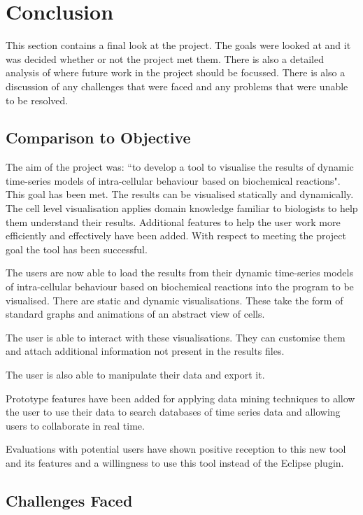 \chapter{Conclusion}

This section contains a final look at the project.  The goals were looked at and it was decided whether or not the project met them.  There is also a detailed analysis of where future work in the project should be focussed.  There is also a discussion of any challenges that were faced and any problems that were unable to be resolved.

\section{Comparison to Objective}
\label{sec:met_goal}

The aim of the project was: ``to develop a tool to visualise the results of dynamic time-series models of intra-cellular behaviour based on biochemical reactions".  This goal has been met.  The results can be visualised statically and dynamically.  The cell level visualisation applies domain knowledge familiar to biologists to help them understand their results.  Additional features to help the user work more efficiently and effectively have been added.  With respect to meeting the project goal the tool has been successful.

The users are now able to load the results from their dynamic time-series models of intra-cellular behaviour based on biochemical reactions into the program to be visualised.  There are static and dynamic visualisations.  These take the form of standard graphs and animations of an abstract view of cells.

The user is able to interact with these visualisations.  They can customise them and attach additional information not present in the results files.

The user is also able to manipulate their data and export it.

Prototype features have been added for applying data mining techniques to allow the user to use their data to search databases of time series data and allowing users to collaborate in real time.

Evaluations with potential users have shown positive reception to this new tool and its features and a willingness to use this tool instead of the Eclipse plugin.

\section{Challenges Faced}

